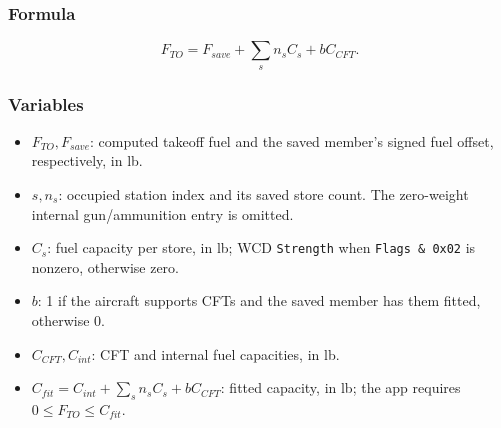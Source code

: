 \documentclass[10pt,a4paper]{amsart}
\begin{document}
\subsubsection*{Formula}
\[
 F_{TO}=F_{save}+\sum_s n_s C_s+bC_{CFT}.
\]

\subsubsection*{Variables}
\begin{itemize}
\setlength{\itemsep}{0pt}
\setlength{\parsep}{0pt}
\item $F_{TO},F_{save}$: computed takeoff fuel and the saved member's signed
fuel offset, respectively, in lb.
\item $s,n_s$: occupied station index and its saved store count. The
zero-weight internal gun/ammunition entry is omitted.
\item $C_s$: fuel capacity per store, in lb; WCD \texttt{Strength}
when \texttt{Flags \& 0x02} is nonzero, otherwise zero.
\item $b$: 1 if the aircraft supports CFTs and the saved member has them
fitted, otherwise 0.
\item $C_{CFT},C_{int}$: CFT and internal fuel capacities, in lb.
\item $C_{fit}=C_{int}+\sum_s n_s C_s+bC_{CFT}$: fitted capacity, in lb;
the app requires $0\leq F_{TO}\leq C_{fit}$.
\end{itemize}
\end{document}
